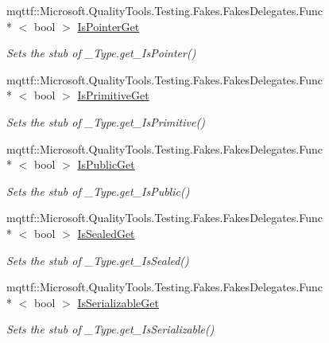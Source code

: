 \begin{DoxyCompactItemize}
mqttf\-::\-Microsoft.\-Quality\-Tools.\-Testing.\-Fakes.\-Fakes\-Delegates.\-Func\\*
$<$ bool $>$ \hyperlink{class_system_1_1_runtime_1_1_interop_services_1_1_fakes_1_1_stub___type_ab126b0a9db9216f62cf82bf4c0ccb3da}{Is\-Pointer\-Get}
\begin{DoxyCompactList}\small\item\em Sets the stub of \-\_\-\-Type.\-get\-\_\-\-Is\-Pointer()\end{DoxyCompactList}\item 
mqttf\-::\-Microsoft.\-Quality\-Tools.\-Testing.\-Fakes.\-Fakes\-Delegates.\-Func\\*
$<$ bool $>$ \hyperlink{class_system_1_1_runtime_1_1_interop_services_1_1_fakes_1_1_stub___type_a42057bb8dfa9b6742aa97b471b5b64b1}{Is\-Primitive\-Get}
\begin{DoxyCompactList}\small\item\em Sets the stub of \-\_\-\-Type.\-get\-\_\-\-Is\-Primitive()\end{DoxyCompactList}\item 
mqttf\-::\-Microsoft.\-Quality\-Tools.\-Testing.\-Fakes.\-Fakes\-Delegates.\-Func\\*
$<$ bool $>$ \hyperlink{class_system_1_1_runtime_1_1_interop_services_1_1_fakes_1_1_stub___type_a671a801a020721f48855c4fe410df346}{Is\-Public\-Get}
\begin{DoxyCompactList}\small\item\em Sets the stub of \-\_\-\-Type.\-get\-\_\-\-Is\-Public()\end{DoxyCompactList}\item 
mqttf\-::\-Microsoft.\-Quality\-Tools.\-Testing.\-Fakes.\-Fakes\-Delegates.\-Func\\*
$<$ bool $>$ \hyperlink{class_system_1_1_runtime_1_1_interop_services_1_1_fakes_1_1_stub___type_a7e0ea819e54cd5126a2c8328c485bf66}{Is\-Sealed\-Get}
\begin{DoxyCompactList}\small\item\em Sets the stub of \-\_\-\-Type.\-get\-\_\-\-Is\-Sealed()\end{DoxyCompactList}\item 
mqttf\-::\-Microsoft.\-Quality\-Tools.\-Testing.\-Fakes.\-Fakes\-Delegates.\-Func\\*
$<$ bool $>$ \hyperlink{class_system_1_1_runtime_1_1_interop_services_1_1_fakes_1_1_stub___type_a018fa26875ea7cd6583c6b1005516763}{Is\-Serializable\-Get}
\begin{DoxyCompactList}\small\item\em Sets the stub of \-\_\-\-Type.\-get\-\_\-\-Is\-Serializable()\end{DoxyCompactList}\item 

\end{DoxyCompactItemize}

